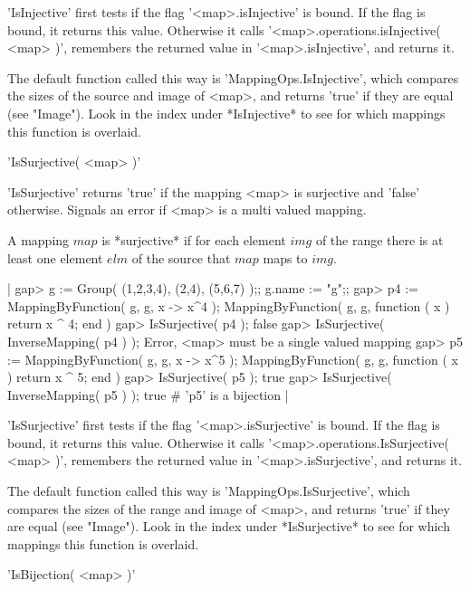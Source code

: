 'IsInjective' first tests if  the flag '<map>.isInjective'  is bound.  If
the   flag   is  bound,  it  returns   this value.   Otherwise   it calls
'<map>.operations.isInjective( <map> )', remembers  the returned value in
'<map>.isInjective', and returns  it. 

The default  function called this  way is 'MappingOps.IsInjective', which
compares  the sizes of the source and image of <map>, and  returns 'true'
if they are equal (see "Image").  Look  in  the index under *IsInjective*
to see for which mappings this function is overlaid.


'IsSurjective( <map> )'

'IsSurjective' returns  'true'  if  the mapping <map> is  surjective  and
'false' otherwise.  Signals an  error if <map> is a multi valued mapping.

A mapping  $map$ is *surjective* if for each element $img$  of the  range
there  is at  least  one  element $elm$  of the source that $map$ maps to
$img$.

|    gap> g := Group( (1,2,3,4), (2,4), (5,6,7) );;  g.name := "g";;
    gap> p4 := MappingByFunction( g, g, x -> x^4 );
    MappingByFunction( g, g, function ( x )
        return x ^ 4;
    end )
    gap> IsSurjective( p4 );
    false
    gap> IsSurjective( InverseMapping( p4 ) );
    Error, <map> must be a single valued mapping
    gap> p5 := MappingByFunction( g, g, x -> x^5 );
    MappingByFunction( g, g, function ( x )
        return x ^ 5;
    end )
    gap> IsSurjective( p5 );
    true
    gap> IsSurjective( InverseMapping( p5 ) );
    true    # 'p5' is a bijection |

'IsSurjective' first tests if the flag '<map>.isSurjective' is bound.  If
the   flag  is bound,  it   returns this    value.  Otherwise    it calls
'<map>.operations.IsSurjective( <map> )', remembers the returned value in
'<map>.isSurjective', and returns  it.

The default function called this  way is 'MappingOps.IsSurjective', which
compares the sizes of the range and image of <map>, and returns 'true' if
they are equal (see "Image").  Look in the  index under *IsSurjective* to
see for which mappings this function is overlaid.


'IsBijection( <map> )'

